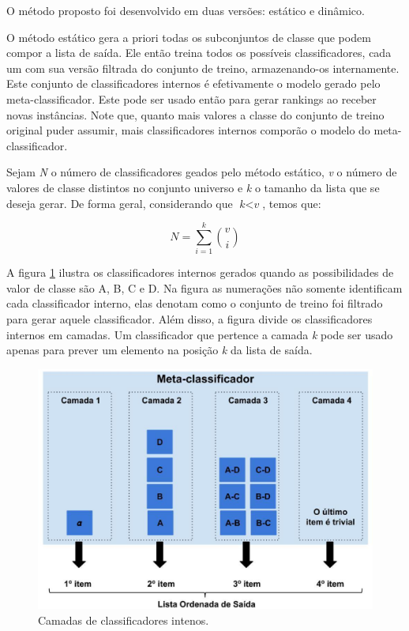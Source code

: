 O método proposto foi desenvolvido em duas versões: estático e dinâmico.

O método estático gera a priori todas os subconjuntos de classe que podem compor a lista de saída. Ele então treina todos os possíveis classificadores, cada um com sua versão filtrada do conjunto de treino, armazenando-os internamente. Este conjunto de classificadores internos é efetivamente o modelo gerado pelo meta-classificador. Este pode ser usado então para gerar rankings ao receber novas instâncias. Note que, quanto mais valores a classe do conjunto de treino original puder assumir, mais classificadores internos comporão o modelo do meta-classificador.

Sejam \textit{N} o número de classificadores geados pelo método estático, \textit{v} o número de valores de classe distintos no conjunto universo e \textit{k} o tamanho da lista que se deseja gerar. De forma geral, considerando que $\textit{k} < \textit{v}$, temos que:

\begin{equation*}

\textit{N} = \sum\limits_{i=1}^k \binom{v}{i}

\end{equation*}

A figura \ref{fig:metodoproposto03} ilustra os classificadores internos gerados quando as possibilidades de valor de classe são A, B, C e D. Na figura as numerações não somente identificam cada classificador interno, elas denotam como o conjunto de treino foi filtrado para gerar aquele classificador. Além disso, a figura divide os classificadores internos em camadas. Um classificador que pertence a camada \textit{k} pode ser usado apenas para prever um elemento na posição \textit{k} da lista de saída.

\begin{figure}[h!]
  \includegraphics[width=\linewidth]{images/metodoproposto03.eps}
  \caption{Camadas de classificadores intenos.}
  \label{fig:metodoproposto03}
\end{figure}

